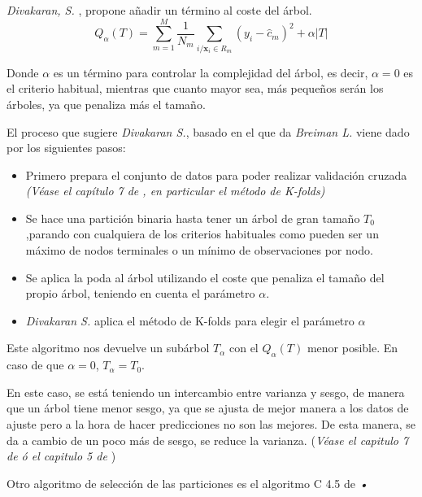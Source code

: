 \noindent \emph{Divakaran, S. }\cite{Divakaran 2022}, propone añadir un término al coste del árbol. 
\begin{equation}
Q_{\alpha}(T)=\sum_{m=1}^M\frac{1}{N_m}\sum_{i/\mathbf{x}_i\in R_m} (y_i-\hat{c}_m)^2+\alpha|T |
\end{equation}

\noindent Donde $\alpha$ es un término para controlar la complejidad del árbol, es decir, $\alpha=0$ es el criterio habitual, mientras que cuanto mayor sea, más pequeños serán los árboles, ya que penaliza más el tamaño.  

\noindent El proceso que sugiere \emph{Divakaran S.}\cite{Divakaran 2022}, basado en el que da \emph{Breiman L.}\cite{Breiman 1984} viene dado por los siguientes pasos:
\begin{itemize}
\item Primero prepara el conjunto de datos para poder realizar validación cruzada \emph{(Véase el capítulo 7 de \cite{Hastie 2001}, en particular el método de K-folds)}
\item Se hace una partición binaria hasta tener un árbol de gran tamaño $T_0$,parando con cualquiera de los criterios habituales como pueden ser un máximo de nodos terminales o un mínimo de observaciones por nodo. 

\item Se aplica la poda al árbol utilizando el coste que penaliza el tamaño del propio árbol, teniendo en cuenta el parámetro $\alpha$. 

\item \emph{Divakaran S.}\cite{Divakaran 2022} aplica el método de K-folds para elegir el parámetro $\alpha$
\end{itemize}

\noindent Este algoritmo nos devuelve un subárbol $T_{\alpha}$ con el $Q_{\alpha}(T)$ menor posible. En caso de que $\alpha=0$, $T_{\alpha}=T_0$.

\noindent En este caso, se está teniendo un intercambio entre varianza y sesgo, de manera que un árbol tiene menor sesgo, ya que se ajusta de mejor manera a los datos de ajuste pero a la hora de hacer predicciones no son las mejores. De esta manera, se da a cambio de un poco más de sesgo, se reduce la varianza. (\emph{Véase el capitulo 7 de \cite{Hastie 2001} ó el capitulo 5 de \cite{James 2013} })

\noindent Otro algoritmo de selección de las particiones es el algoritmo C 4.5 de \emph{•}




